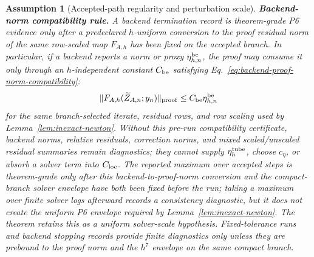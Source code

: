 \documentclass[preprint,12pt]{elsarticle}
\newtheorem{assumption}{Assumption}
\begin{document}
\begin{assumption}[Accepted-path regularity and perturbation scale]
\noindent\textbf{Backend-norm compatibility rule.}
A backend termination record is theorem-grade P6 evidence only after a
predeclared \(h\)-uniform conversion to the proof residual norm of the same
row-scaled map \(F_{A,h}\) has been fixed on the accepted branch. In
particular, if a backend reports a norm or proxy
\(\eta_{h,n}^{\rm be}\), the proof may consume it only through an
\(h\)-independent constant \(C_{\rm be}\) satisfying
Eq.~\eqref{eq:backend-proof-norm-compatibility}:
\begin{equation}
\label{eq:backend-proof-norm-compatibility}
  \|F_{A,h}(\widetilde Z_{A,n};y_n)\|_{\rm proof}
  \le C_{\rm be}\eta_{h,n}^{\rm be}
\end{equation}
for the same branch-selected iterate, residual rows, and row scaling used by
Lemma~\ref{lem:inexact-newton}. Without this pre-run compatibility
certificate, backend norms, relative residuals, correction norms, and mixed
scaled/unscaled residual summaries remain diagnostics; they cannot supply
\(\eta_h^{\rm tube}\), choose \(c_\eta\), or absorb a solver term into
\(C_{\rm loc}\).
The reported maximum over accepted steps is theorem-grade only after this
backend-to-proof-norm conversion and the compact-branch solver envelope have
both been fixed before the run; taking a maximum over finite solver logs
afterward records a consistency diagnostic, but it does not create the
uniform P6 envelope required by Lemma~\ref{lem:inexact-newton}.
The theorem retains this as a uniform solver-scale hypothesis. Fixed-tolerance
runs and backend stopping records provide finite diagnostics only unless they
are prebound to the proof norm and the \(h^7\) envelope on the same compact
branch.
\end{assumption}
\end{document}
